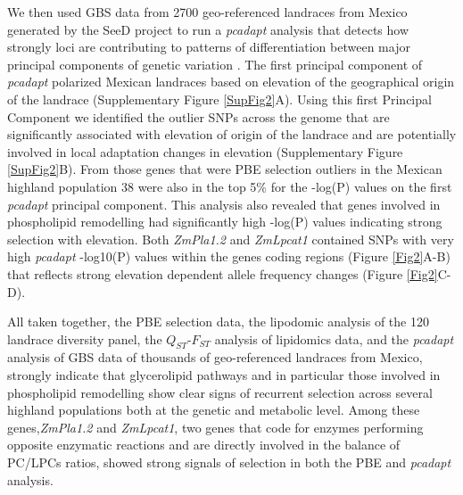 \documentclass[9pt,twocolumn,twoside]{BioRxiv}
\begin{document}
We then used GBS data from 2700 geo-referenced landraces from Mexico generated by the SeeD project \citep{Romero_Navarro2017-cn, Gates2019-xu} to run a \textit{pcadapt} analysis that detects how strongly loci are contributing to patterns of differentiation between major principal components of genetic variation \citep{Luu2017-ws}.
The first principal component of \textit{pcadapt} polarized Mexican landraces based on elevation of the geographical origin of the landrace (Supplementary Figure \ref{SupFig2}A).
Using this first Principal Component we identified the outlier SNPs across the genome that are significantly associated with elevation of origin of the landrace and are potentially involved in local adaptation changes in elevation (Supplementary Figure \ref{SupFig2}B). 
From those genes that were PBE selection outliers in the Mexican highland population 38 were also in the top 5\% for the -log(P) values on the first \textit{pcadapt} principal component. 
This analysis also revealed that genes involved in phospholipid remodelling had significantly high -log(P) values indicating strong selection with elevation. 
Both \textit{ZmPla1.2} and \textit{ZmLpcat1} contained SNPs with very high \textit{pcadapt} -log10(P) values within the genes coding regions (Figure \ref{Fig2}A-B) that reflects strong elevation dependent allele frequency changes  (Figure \ref{Fig2}C-D).

All taken together, the PBE selection data, the lipodomic analysis of the 120 landrace diversity panel, the $Q_{ST}$-$F_{ST}$ analysis of lipidomics data, and the \textit{pcadapt} analysis of GBS data of thousands of geo-referenced landraces from Mexico, strongly indicate that glycerolipid pathways and in particular those involved in phospholipid remodelling show clear signs of recurrent selection across several highland populations both at the genetic and metabolic level. 
Among these genes,\textit{ZmPla1.2} and \textit{ZmLpcat1}, two genes that code for enzymes performing opposite enzymatic reactions and are directly involved in the balance of PC/LPCs ratios, showed strong signals of selection in both the PBE and \textit{pcadapt} analysis.    
\end{document}
